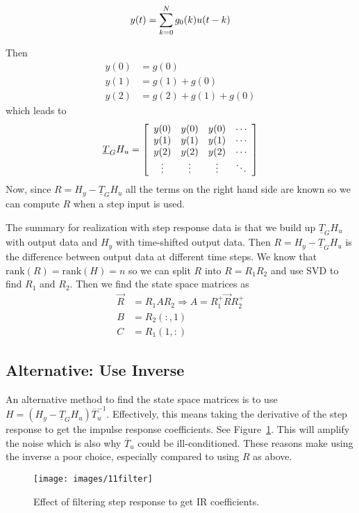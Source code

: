 \begin{equation*}
y(t)=\sum_{k=0}^N g_0(k)u(t-k)
\end{equation*}

Then
\begin{align*}
y(0) &= g(0) \\
y(1) &= g(1) + g(0) \\
y(2) &= g(2) + g(1) + g(0)
\end{align*}
which leads to
\begin{align*}
\underline{T}_G H_u = \left[\begin{array}{c c c c}
y(0) & y(0) & y(0) & \cdots \\
y(1) & y(1) & y(1) & \cdots \\
y(2) & y(2) & y(2) & \cdots \\
\vdots & \vdots & \vdots & \ddots
\end{array}\right]
\end{align*}
Now, since $R=H_y-\underline{T}_G H_u$ all the terms on the right hand side are known so we can compute $R$ when a step input is used.

The summary for realization with step response data is that we build up $\underline{T}_G H_u$ with output data and $H_y$ with time-shifted output data.
Then $R=H_y-\underline{T}_G H_u$ is the difference between output data at different time steps.
We know that $\text{rank}(R)=\text{rank}(H)=n$ so we can split $R$ into $R=R_1R_2$ and use SVD to find $R_1$ and $R_2$.
Then we find the state space matrices as
\begin{align*}
\vec{R} &= R_1AR_2 \Rightarrow A=R_1^+\vec{R}R_2^+ \\
B &= R_2(:,1) \\
C &= R_1(1,:)
\end{align*}

\subsection{Alternative: Use Inverse}
An alternative method to find the state space matrices is to use $H=(H_y-\underline{T}_G H_u)\overline{T}_u^{-1}$.
Effectively, this means taking the derivative of the step response to get the impulse response coefficients.
See Figure~\ref{fig:11filter}.
This will amplify the noise which is also why $\overline{T}_u$ could be ill-conditioned.
These reasons make using the inverse a poor choice, especially compared to using $R$ as above.

\begin{figure}[ht!]
\centering
\texttt{[image: images/11filter]}
\caption{Effect of filtering step response to get IR coefficients.}%
\label{fig:11filter}
\end{figure}

